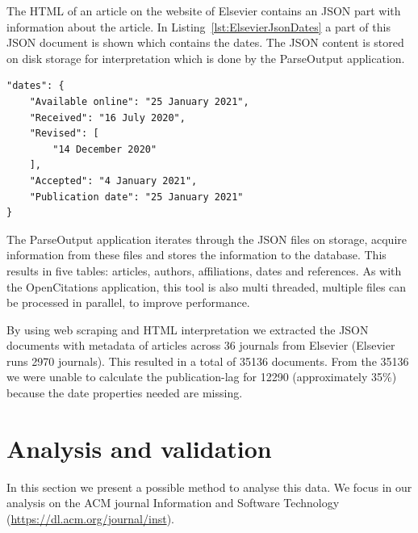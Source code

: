 \documentclass{ou-report}
\newcommand{\outline}[1]{{\color{blue} #1}}
\begin{document}
The HTML of an article on the website of Elsevier contains an JSON part with
information about the article. In Listing~\ref{lst:ElsevierJsonDates} a part
of this JSON document is shown which contains the dates. The JSON content is
stored on disk storage for interpretation which is done by the ParseOutput application.

\begin{lstlisting}[caption={Dates in the JSON document},label={lst:ElsevierJsonDates}]
"dates": {
    "Available online": "25 January 2021",
    "Received": "16 July 2020",
    "Revised": [
        "14 December 2020"
    ],
    "Accepted": "4 January 2021",
    "Publication date": "25 January 2021"
}
\end{lstlisting}

The ParseOutput application iterates through the JSON files on storage, acquire
information from these files and stores the information to the database. This
results in five tables: articles, authors, affiliations, dates and references.
As with the OpenCitations application, this tool is also multi threaded, multiple
files can be processed in parallel, to improve performance.



By using web scraping and HTML interpretation we extracted the JSON documents 
with metadata of articles across 36 journals from Elsevier (Elsevier runs 2970 
journals). This resulted in a total of 35136 documents.
From the 35136 we were unable to calculate the publication-lag for 12290
(approximately 35\%) because the date properties needed are missing.





\section{Analysis and validation}
In this section we present a possible method to analyse this data. We focus in
our analysis on the ACM journal Information and Software Technology
(\url{https://dl.acm.org/journal/inst}).
\end{document}
